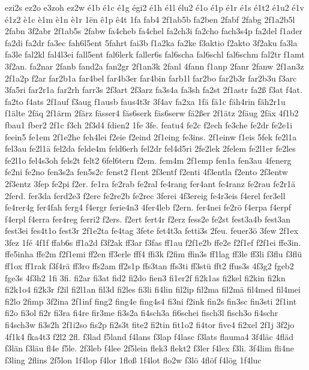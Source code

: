 {ezi2s
ez2o
e3zoh
ez2w
é1b
é1c
é1g
égi2
é1h
é1l
élu2
é1o
é1p
é1r
é1s
é1t2
é1u2
é1v
é1z2
è1c
è1m
è1n
è1r
1ën
ê1p
ê4t
1fa
fab4
2f1ab5b
fa2ben
2fabf
2fabg
2f1a2b5l
2fabn
3f2abr
2f1ab5s
2fabw
fa4cheb
fa4chel
fa2ch3i
fa2cho
fach3s4p
fa2del
f1ader
fa2di
fa2dr
fa3ec
fah6l5ent
5fahrt
fai3b
f1a2ka
fa2ke
f3aktio
f2akto
3f2aku
fa3la
fa3le
fal2kl
fal4l3ei
fall5ent
fal6lerk
faller6s
fal6scha
fal6schl
fal6schm
fal2tr
f1amt
3f2an.
fa2nar
2fanb
fand2a
fan2gr
2f1an3k
2fanl
4fann
f1anp
2fanr
2fanw
2f1an3z
2f1a2p
f2ar
far2b1a
far4bel
far4b3er
far4bin
farb1l
far2bo
far2b3r
far2b3u
f3arc
3fa5ri
far2r1a
far2rh
farr3s
2f3art
2f3arz
fa3s4a
fa3sh
fa2st
2f1astr
fa2ß
f3at
f4at.
fa2to
f4ats
2f1auf
f3aug
f1ausb
faus4t3r
3f4av
fa2xa
1fä
fä1c
fäh4rin
fäh2r1u
f1älte
2fäq
2f1ärm
2färz
fässer4
fäs6serk
fäs6serw
fä2ßer
2f1ätz
2fäug
2fäx
4f1b2
fbau1
fber2
2f1c
f3ch
2f3d4
fdien2
1fe
3fe.
featu4
fe2c
f2ech
fe3che
fe2dr
fe2e1i
feein5
fe1em
2f1e2he
feh4lei
f2eie
f2eind
2f1eing
fe3ins.
2f1einw
f1eis
5fek
fe2l1a
fel3au
fe2l1ä
fel2da
felde4m
feld6erh
fel2dr
fel4d5ri
2fe2lek
2felem
fe2l1er
fe2les
fe2l1o
fel4s3oh
fels2t
felt2
6fel6tern
f2em.
fem4m
2f1emp
fen1a
fen3au
4fenerg
fe2ni
fe2no
fen3s2a
fen5s2c
fenst2
f1ent
2f3entf
f2enti
4f3entla
f2ento
2f3entw
2f3entz
3fep
fe2pi
f2er.
fe1ra
fe2rab
fe2ral
fe4rang
fer4ant
fe4ranz
fe2rau
fe2r1ä
2ferd.
fer3da
ferd2e3
f2ere
fe2re2b
fe2rec
3ferei
4f3ereig
fe4r3eis
f4erel
fer3ell
fe4rer4g
fer4fah
ferg4
f4ergr
ferie4n3
4fer4leb
f2ern.
fer4nei
fe2rö
f4erpa
f4erpf
f4erpl
f4erra
fer4reg
ferri2
f2ers.
f2ert
fert4r
f2erz
fess2e
fe2st
fest3a4b
fest3an
fest3ei
fes4t1o
fest3r
2f1e2ta
fe4tag
3fete
fet4t3a
fetti3s
2feu.
feuer3ö
3few
2f1ex
3fez
1fé
4f1f
ffab6s
ff1a2d
f3f2ak
ff3ar
f3fas
ff1au
f2f1e2b
ffe2e
f2f1ef
f2f1ei
ffe3in.
ffe5inha
ffe2m
f2f1emi
ff2en
ff3erle
fff4
ffi3k
f2fim
ffin3s
ff1lag
ff3le
ff3li
f3flu
f3flü
ff1ox
ff1rak
f3f4rä
ff3ro
ffs2am
ff2s1p
ffs3tan
ffs3ti
ff3stü
fft2
ffus3s
4f3g2
fgeb2
fge3s
4f3h2
1fi
3fi.
fi2ar
fi3at
fid2
fi2do
fien3
fi1er2f
fi2k1as
fi2kel
fi2kin
fi2kn
fi2k1o4
fi2k3r
f2il
fi2l1an
fil3d
fi2les
fi3li
fi4lin
fil2ip
fil2ma
fil2mä
fil4med
fil4mei
fi2lo
2fimp
3f2ina
2f1inf
fing2
fing4e
fing4s4
fi3ni
f2ink
fin2s
fin3sc
fin3sti
2f1int
fi2o
fi3ol
fi2r
fi3ra
fi4re
fir3me
fi3s2a
fi4sch3a
fi6schei
fisch3l
fisch3o
fi4schr
fi4sch3w
fi3s2h
2f1i2so
fis2p
fi2s3t
fite2
fi2tin
fit1o2
fi4tor
five4
fi2xel
2f1j
3f2jo
4f1k4
fka4t3
f2l2
2fl.
f3lad
f5land
f4lans
f3lap
f4lasc
f3lats
flauma4
3f4läc
4fläd
f3län
f3läu
fl4e
f5le.
2f3leb
f4lee
2f5lein
flek3
flekt2
f3ler
f4lex
f3li.
3f4lim
fli4ne
f3ling
2flins
2f5lon
1f4lop
f4lor
1floß
1f4lot
flo2w
f3lö
4flöf
f4lög
1f4luc
}
